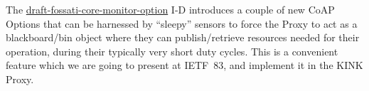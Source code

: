 The \href{https://github.com/koanlogic/webthings/blob/master/docs/draft-core-monitor-option/}{draft-fossati-core-monitor-option} I-D introduces a couple of new CoAP Options that can be harnessed by ``sleepy'' sensors to force the Proxy to act as a blackboard/bin object where they can publish/retrieve resources needed for their operation, during their typically very short duty cycles.  This is a convenient feature which we are going to present at \mbox{IETF 83}, and implement it in the KINK Proxy.


